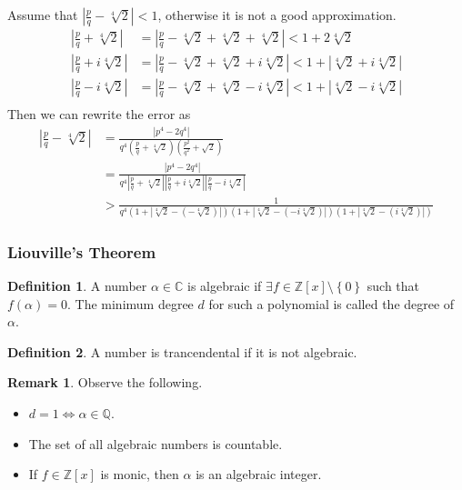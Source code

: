 \documentclass[11pt]{article}
\theoremstyle{definition}
\newtheorem{defn}{Definition}[section]
\newtheorem{remark}{Remark}[section]
\newcommand{\sm}[0]{\setminus}
\newcommand{\set}[1]{\left\{ #1 \right\}}
\newcommand{\abs}[1]{\left\lvert#1\right\rvert} %
\newcommand{\QQ}{\mathbb{Q}}
\newcommand{\ZZ}{\mathbb{Z}}
\newcommand{\CC}{\mathbb{C}}
\begin{document}
	Assume that $\abs{\frac{p}{q} - \sqrt[4]2} < 1$, otherwise it is not a good approximation. 
	\begin{align*}
		\abs{\frac{p}{q} + \sqrt[4]2}  &= \abs{\frac{p}{q} - \sqrt[4]2 + \sqrt[4]2 + \sqrt[4]2}  < 1 + 2\sqrt[4]2 \\
		\abs{\frac{p}{q} + i\sqrt[4]2} &= \abs{\frac{p}{q} - \sqrt[4]2 + \sqrt[4]2 + i\sqrt[4]2} < 1 + \abs{\sqrt[4]2+i\sqrt[4]2} \\
		\abs{\frac{p}{q} - i\sqrt[4]2} &= \abs{\frac{p}{q} - \sqrt[4]2 + \sqrt[4]2 - i\sqrt[4]2} < 1 + \abs{\sqrt[4]2-i\sqrt[4]2} \\
	\end{align*}
	Then we can rewrite the error as
	\begin{align*}
		\abs{\frac{p}{q} - \sqrt[4]{2}} 
		&= \frac{\abs{p^4 - 2q^4}}{q^4 \left(\frac{p}{q} + \sqrt[4]{2}\right)\left(\frac{p^2}{q^2} + \sqrt{2}\right)} \\
		&= \frac{\abs{p^4 - 2q^4}}{q^4 \abs{\frac{p}{q} + \sqrt[4]2} \abs{\frac{p}{q} + i\sqrt[4]2} \abs{\frac{p}{q} - i\sqrt[4]2}} \\
		&> \frac1{q^4 (1+\abs{\sqrt[4]2 - (-\sqrt[4]2)}) (1+\abs{\sqrt[4]2 - (-i\sqrt[4]2)}) (1 + \abs{\sqrt[4]2 - (i\sqrt[4]2)})}
	\end{align*}


\subsubsection{Liouville's Theorem}

\begin{defn}
	A number $\alpha \in \CC$ is algebraic if $\exists f \in \ZZ[x]\sm\set{0}$ such that $f(\alpha)=0$. 
	The minimum degree $d$ for such a polynomial is called the degree of $\alpha$.
\end{defn}
\begin{defn}
	A number is trancendental if it is not algebraic.
\end{defn}

\begin{remark}
	Observe the following.
	\begin{itemize}
		\item $d=1 \iff \alpha \in \QQ$. 
		\item The set of all algebraic numbers is countable.
		\item If $f\in\ZZ[x]$ is monic, then $\alpha$ is an algebraic integer. 
	\end{itemize}
\end{remark}
\end{document}
